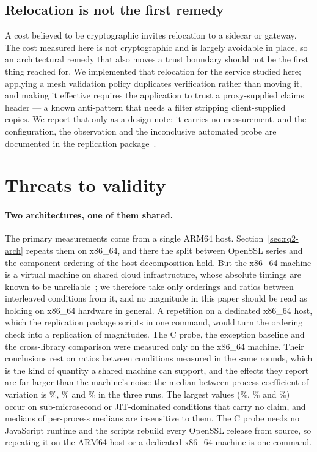 \documentclass[pdflatex,sn-basic,twocolumn]{sn-jnl}%
\begin{document}
\subsection{Relocation is not the first remedy}\label{sec:offload}

A cost believed to be cryptographic invites relocation to a sidecar or gateway.
The cost measured here is not cryptographic and is largely avoidable in place,
so an architectural remedy that also moves a trust boundary should not be the
first thing reached for. We implemented that relocation for the service
studied here; applying a mesh validation policy duplicates verification rather
than moving it, and making it effective requires the application to trust a
proxy-supplied claims header --- a known anti-pattern that needs a filter
stripping client-supplied copies. We report that only as a design note: it
carries no measurement, and the configuration, the observation and the
inconclusive automated probe are documented in the replication
package~\citep{artifact2026}.

\section{Threats to validity}\label{sec:threats}

\paragraph{Two architectures, one of them shared.} The primary measurements
come from a single ARM64 host. Section~\ref{sec:rq2-arch} repeats them on
x86\_64, and there the split between OpenSSL series and the component
ordering of the host decomposition hold. But the x86\_64 machine is a virtual machine on shared
cloud infrastructure, whose absolute timings are known to be
unreliable~\citep{laaber2019cloud}; we therefore take only orderings and ratios
between interleaved conditions from it, and no magnitude in this paper should
be read as holding on x86\_64 hardware in general. A repetition on a dedicated
x86\_64 host, which the replication package scripts in one command, would turn
the ordering check into a replication of magnitudes. The C probe, the exception
baseline and the cross-library comparison were measured only on the x86\_64
machine. Their conclusions rest on ratios between conditions measured in the
same rounds, which is the kind of quantity a shared machine can support, and
the effects they report are far larger than the machine's noise: the median
between-process coefficient of variation is \CProbeCvMedian\%,
\ExcCvMedian\% and \XlibCvMedian\% in the three runs. The largest values
(\CProbeCvMax\%, \ExcCvMax\% and \XlibCvMax\%) occur on sub-microsecond or
JIT-dominated conditions that carry no claim, and medians of per-process
medians are insensitive to them. The C probe needs no JavaScript runtime and
the scripts rebuild every OpenSSL release from source, so repeating it on the
ARM64 host or a dedicated x86\_64 machine is one command.
\end{document}

